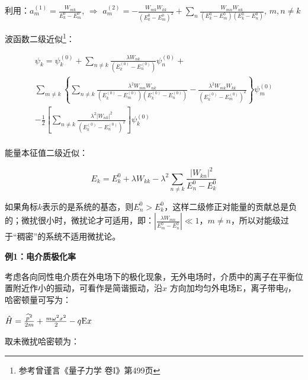利用：$a_m^{(1)}  = \frac{{W_{mk} }}{{E_k^0  - E_m^0 }}$, $\Rightarrow$
$a_m^{(2)}  =  - \frac{{W_{mk} W_{kk} }}{{\left( {E_k^0  - E_m^0 } \right)^2 }} + \sum\limits_n {\frac{{W_{mn} W_{nk} }}{{\left( {E_k^0  - E_m^0 } \right)\left( {E_k^0  - E_n^0 } \right)}}} $, $m,n \ne k$


波函数二级近似\footnote{参考曾谨言《量子力学 卷I》第499页}：

\begin{equation}\label{22-13}
\begin{array}{c}
 \psi _k  = \psi _k^{(0)}  + \sum\limits_{n \ne k} {\frac{{\lambda W_{nk} }}{{\left( {E_k^{(0)}  - E_n^{(0)} } \right)}}\psi _n^{(0)} }  + \\
  \sum\limits_{m \ne k} {\left\{ {\sum\limits_{n \ne k} {\frac{{\lambda ^2 W_{mn} W_{nk} }}{{\left( {E_k^{(0)}  - E_m^{(0)} } \right)\left( {E_k^{(0)}  - E_n^{(0)} } \right)}} - \frac{{\lambda ^2 W_{mk} W_{kk} }}{{\left( {E_k^{(0)}  - E_m^{(0)} } \right)^2 }}} } \right\}} \psi _m^{(0)}  \\
 - \frac{1}{2}\left[ {\sum\limits_{n \ne k} {\frac{{\lambda ^2 \left| {W_{nk} } \right|^2 }}{{\left( {E_k^{(0)}  - E_n^{(0)} } \right)^2 }}} } \right]\psi _k^{(0)}  \\
 \end{array}
\end{equation}

能量本征值二级近似：

\begin{equation}\label{22-14}
E_k  = E_k^0  + \lambda W_{kk}  - \lambda ^2 \sum\limits_{n \ne k} {\frac{{\left| {W_{kn} } \right|^2 }}{{E_n^0  - E_k^0 }}}
\end{equation}


如果角标$k$表示的是系统的基态，则$E_n^0  > E_k^0 $，这样二级修正对能量的贡献总是负的；微扰很小时，微扰论才可适用，即：$\left| {\frac{{\lambda W_{mn} }}{{E_m^0  - E_n^0 }}} \right| \ll 1$，$m \ne n$，所以对能级过于``稠密''的系统不适用微扰论。

\textbf{例1：电介质极化率}


考虑各向同性电介质在外电场下的极化现象，无外电场时，介质中的离子在平衡位置附近作小的振动，可看作是简谐振动，沿$x$ 方向加均匀外电场$\rm E$，离子带电$q$，哈密顿量可写为：

\begin{center}
$\hat H = \frac{{\widehat p^2 }}{{2m}} + \frac{{m\omega ^2 x^2 }}{2} - q{\rm E}x$
\end{center}

取未微扰哈密顿为：

